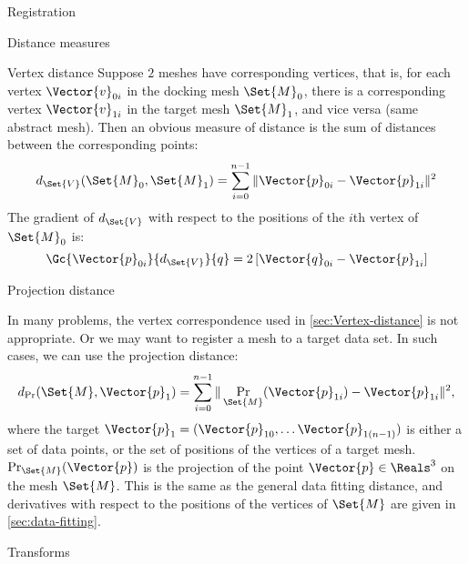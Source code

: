 \begin{plSection}{Registration}
\begin{plSection}{Distance measures}
\begin{plSection}{Vertex distance}
Suppose $2$ meshes have corresponding vertices,
that is,
for each vertex $\Vector{v}_{0i}$ in the docking mesh $\Set{M}_0$,
there is a corresponding vertex $\Vector{v}_{1i}$ 
in the target mesh $\Set{M}_1$,
and vice versa (same abstract mesh).
Then an obvious measure of distance
is the sum of distances between the corresponding points:
\begin{equation}
d_{\Set{V}}(\Set{M}_0,\Set{M}_1) = 
\sum_{i=0}^{n-1} \| \Vector{p}_{0i} - \Vector{p}_{1i} \|^2
\end{equation}
The gradient of $d_{\Set{V}}$ with respect to the positions
of the $i$th vertex of $\Set{M}_0$ is:
\begin{equation}
\Gc{\Vector{p}_{0i}}{d_{\Set{V}}}{q} = 
2 \left[ \Vector{q}_{0i} - \Vector{p}_{1i} \right]
\end{equation}

\end{plSection}%
\begin{plSection}{Projection distance}
\label{sec:Projection-distance}

In many problems, the vertex correspondence used in
\cref{sec:Vertex-distance} is not appropriate.
Or we may want to register a mesh to a target data set.
In such cases, we can use the projection distance:
\begin{equation}
d_{\Pr}(\Set{M},\Vector{p}_1) = \sum_{i=0}^{n-1} \| \Pr_{\Set{M}}(\Vector{p}_{1i}) - \Vector{p}_{1i} \|^2,
\end{equation}
where the target $\Vector{p}_1 = (\Vector{p}_{10}, \ldots \Vector{p}_{1(n-1)})$
is either a set of data points,
or the set of positions of the vertices of a target mesh.
$\Pr_{\Set{M}}(\Vector{p})$ is the projection of the point $\Vector{p} \in \Reals^3$
on the mesh $\Set{M}$.
This is the same as the general data fitting distance, and
derivatives with respect to the positions of the vertices
of $\Set{M}$ are given in \cref{sec:data-fitting}.

\end{plSection}%
\end{plSection}%
\begin{plSection}{Transforms}
\label{sec:Transforms}


\end{plSection}
\end{plSection}
